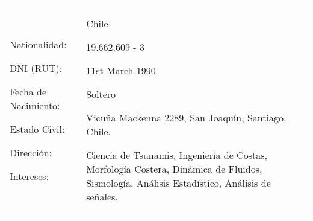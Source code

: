 

\begin{tabularx}{\textwidth}{p{4cm}X X@{}} %
Nationalidad: \par
DNI (RUT): \par
Fecha de Nacimiento: \par
Estado Civil:  \par
Dirección: \par
Intereses:
&
Chile \par
19.662.609 - 3 \par
11st March 1990 \par
Soltero \par
Vicu\~{n}a Mackenna 2289, San Joaquín, Santiago, Chile.\par
Ciencia de Tsunamis, Ingeniería de Costas, Morfología Costera, Dinámica de Fluidos, Sismología, Análisis Estadístico, Análisis de señales. 
\\
\end{tabularx}

